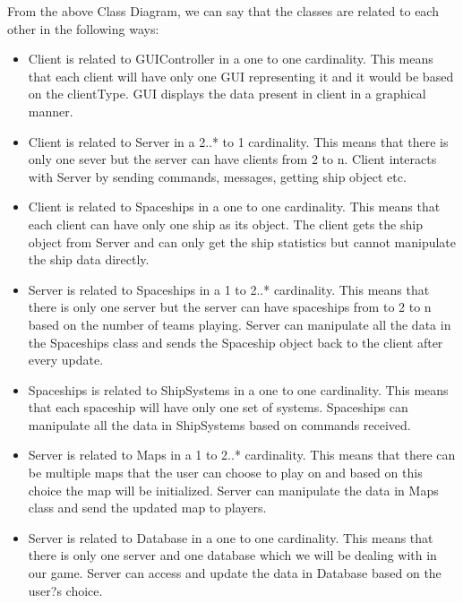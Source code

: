 From the above Class Diagram, we can say that the classes are related to each other in the following ways:

\begin{itemize}
\item Client is related to GUIController in a one to one cardinality. This means that each client will have only one GUI representing it and it would be based on the clientType. GUI displays the data present in client in a graphical manner.
\item Client is related to Server in a 2..* to 1 cardinality. This means that there is only one sever but the server can have clients from 2 to n. Client interacts with Server by sending commands, messages, getting ship object etc.
\item Client is related to Spaceships in a one to one cardinality. This means that each client can have only one ship as its object. The client gets the ship object from Server and can only get the ship statistics but cannot manipulate the ship data directly.
\item Server is related to Spaceships in a 1 to 2..* cardinality. This means that there is only one server but the server can have spaceships from to 2 to n based on the number of teams playing. Server can manipulate all the data in the Spaceships class and sends the Spaceship object back to the client after every update.
\item Spaceships is related to ShipSystems in a one to one cardinality. This means that each spaceship will have only one set of systems. Spaceships can manipulate all the data in ShipSystems based on commands received.
\item Server is related to Maps in a 1 to 2..* cardinality. This means that there can be multiple maps that the user can choose to play on and based on this choice the map will be initialized. Server can manipulate the data in Maps class and send the updated map to players.
\item Server is related to Database in a one to one cardinality. This means that there is only one server and one database which we will be dealing with in our game. Server can access and update the data in Database based on the user?s choice.
\end{itemize}